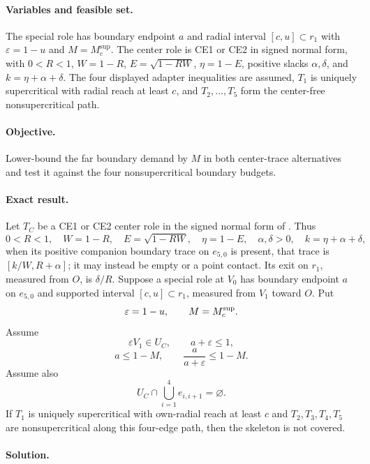 \paragraph{Variables and feasible set.}
The special role has boundary endpoint $a$ and radial interval
$[c,u]\subset r_1$ with $\varepsilon=1-u$ and
$M=M_c^{\mathrm{sup}}$.  The center role is CE1 or CE2 in signed normal form,
with $0<R<1$, $W=1-R$, $E=\sqrt{1-RW}$,
$\eta=1-E$, positive slacks $\alpha,\delta$, and
$k=\eta+\alpha+\delta$.  The four displayed adapter inequalities are
assumed, $T_1$ is uniquely supercritical with radial reach at least $c$, and
$T_2,\ldots,T_5$ form the center-free nonsupercritical path.

\paragraph{Objective.}
Lower-bound the far boundary demand by $M$ in both center-trace alternatives
and test it against the four nonsupercritical boundary budgets.

\paragraph{Exact result.}

\begin{lemma}
\label{lem:app-rescuer-tail-budget}
Let $T_C$ be a CE1 or CE2 center role in the signed normal form of
.  Thus
\[
 0<R<1,
 \quad W=1-R,
 \quad E=\sqrt{1-RW},
 \quad \eta=1-E,
 \quad \alpha,\delta>0,
 \quad k=\eta+\alpha+\delta,
\]
when its positive companion boundary trace on $e_{5,0}$ is present, that
trace is $[k/W,R+\alpha]$; it may instead be empty or a point contact.  Its
exit on $r_1$, measured from $O$, is $\delta/R$.
Suppose a special role at $V_0$ has boundary endpoint $a$ on $e_{5,0}$ and
supported interval $[c,u]\subset r_1$, measured from $V_1$ toward $O$.
Put
\[
 \varepsilon=1-u,\qquad M=M_c^{\rm sup}.
\]
Assume
\[
 \varepsilon V_1\in U_C,\qquad a+\varepsilon\le1,
\]
\[
 a\le1-M,\qquad
 \frac{a}{a+\varepsilon}\le1-M.
\]
Assume also
\[
 U_C\cap\bigcup_{i=1}^4e_{i,i+1}=\varnothing.
\]
If $T_1$ is uniquely supercritical with own-radial reach at least $c$ and
$T_2,T_3,T_4,T_5$ are nonsupercritical along this four-edge path,
then the skeleton is not covered.
\end{lemma}

\paragraph{Solution.}

